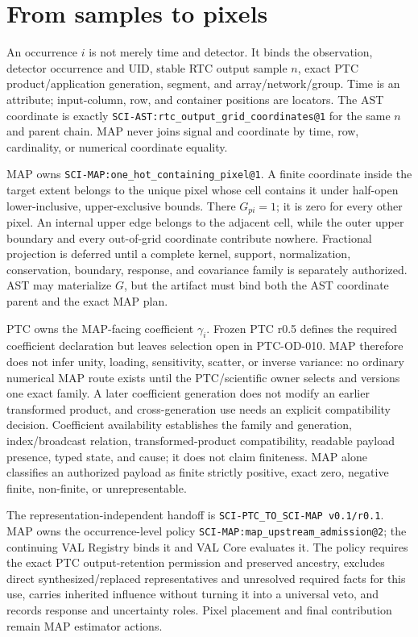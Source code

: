 \documentclass[10pt]{article}
\newcommand{\code}[1]{\nolinkurl{#1}}
\begin{document}
\clearpage
\section{From samples to pixels}\label{sec:samples}
An occurrence \(i\) is not merely time and detector. It binds the observation,
detector occurrence and UID, stable RTC output sample \(n\), exact PTC
product/application generation, segment, and array/network/group. Time is an
attribute; input-column, row, and container positions are locators. The AST
coordinate is exactly \code{SCI-AST:rtc_output_grid_coordinates@1} for the
same \(n\) and parent chain. MAP never joins signal and coordinate by time,
row, cardinality, or numerical coordinate equality.

MAP owns \code{SCI-MAP:one_hot_containing_pixel@1}. A finite coordinate inside
the target extent belongs to the unique pixel whose cell contains it under
half-open lower-inclusive, upper-exclusive bounds. There \(G_{pi}=1\); it is
zero for every other pixel. An internal upper edge belongs to the adjacent
cell, while the outer upper boundary and every out-of-grid coordinate
contribute nowhere. Fractional projection is deferred until a complete
kernel, support, normalization, conservation, boundary, response, and
covariance family is separately authorized. AST may materialize \(G\), but the
artifact must bind both the AST coordinate parent and the exact MAP plan.

PTC owns the MAP-facing coefficient \(\gamma_i\). Frozen PTC r0.5 defines the
required coefficient declaration but leaves selection open in PTC-OD-010.
MAP therefore does not infer unity, loading, sensitivity, scatter, or inverse
variance: no ordinary numerical MAP route exists until the PTC/scientific
owner selects and versions one exact family. A later coefficient generation
does not modify an earlier transformed product, and cross-generation use needs
an explicit compatibility decision. Coefficient availability establishes the
family and generation, index/broadcast relation, transformed-product
compatibility, readable payload presence, typed state, and cause; it does not
claim finiteness. MAP alone classifies an authorized payload as finite
strictly positive, exact zero, negative finite, non-finite, or unrepresentable.

The representation-independent handoff is
\code{SCI-PTC_TO_SCI-MAP v0.1/r0.1}. MAP owns the occurrence-level policy
\code{SCI-MAP:map_upstream_admission@2}; the continuing VAL Registry binds it
and VAL Core evaluates it. The policy requires the exact PTC output-retention
permission and preserved ancestry, excludes direct synthesized/replaced
representatives and unresolved required facts for this use, carries inherited
influence without turning it into a universal veto, and records response and
uncertainty roles. Pixel placement and final contribution remain MAP
estimator actions.
\end{document}
